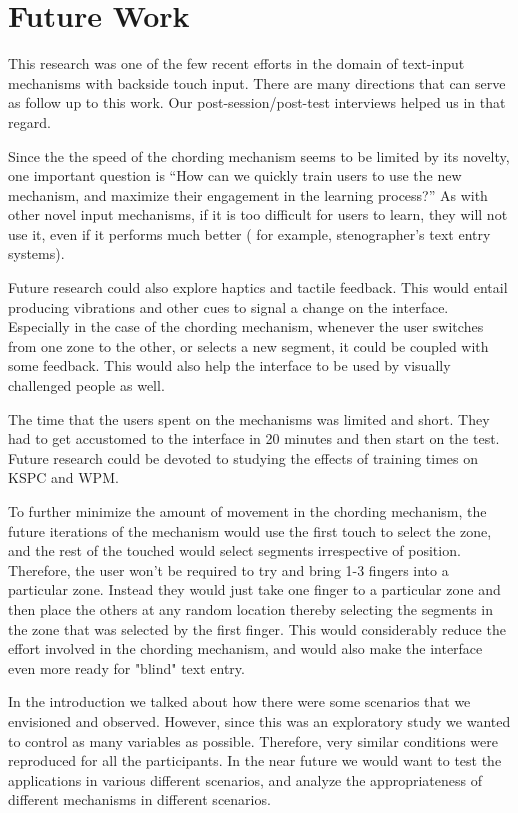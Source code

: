 \section{Future Work}

This research was one of the few recent efforts in the domain of
text-input mechanisms with backside touch input. There are many
directions that can serve as follow up to this work. Our
post-session/post-test interviews helped us in that regard.

Since the the speed of the chording mechanism seems to be limited by
its novelty, one important question is ``How can we quickly train
users to use the new mechanism, and maximize their engagement in the
learning process?''  As with other novel input mechanisms, if it is
too difficult for users to learn, they will not use it, even if it
performs much better ( for example, stenographer's text entry
systems).

Future research could also explore haptics and tactile feedback. This
would entail producing vibrations and other cues to signal a change on
the interface. Especially in the case of the chording mechanism,
whenever the user switches from one zone to the other, or selects a
new segment, it could be coupled with some feedback. This would also
help the interface to be used by visually challenged people as well.

The time that the users spent on the mechanisms was limited and short. They had to get accustomed to the interface in 20 minutes and then start on the test. Future research could be devoted to studying the effects of training times on KSPC and WPM. 

To further minimize the amount of movement in the chording mechanism, the future iterations of the mechanism would use the first touch to select the zone, and the rest of the touched would select segments irrespective of position. Therefore, the user won't be required to try and bring 1-3 fingers into a particular zone. Instead they would just take one finger to a particular zone and then place the others at any random location thereby selecting the segments in the zone that was selected by the first finger. This would considerably reduce the effort involved in the chording mechanism, and would also make the interface even more ready for "blind" text entry.

In the introduction we talked about how there were some scenarios that we envisioned and observed. However, since this was an exploratory study we wanted to control as many variables as possible. Therefore, very similar conditions were reproduced for all the participants. In the near future we would want to test the applications in various different scenarios, and analyze the appropriateness of different mechanisms in different scenarios.
